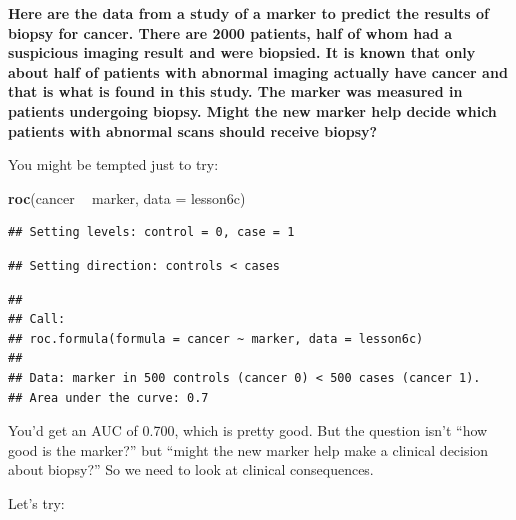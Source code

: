 \documentclass[]{book}
\newenvironment{Shaded}{\begin{snugshade}}{\end{snugshade}}
\newcommand{\CommentTok}[1]{\textcolor[rgb]{0.56,0.35,0.01}{\textit{#1}}}
\newcommand{\DataTypeTok}[1]{\textcolor[rgb]{0.13,0.29,0.53}{#1}}
\newcommand{\KeywordTok}[1]{\textcolor[rgb]{0.13,0.29,0.53}{\textbf{#1}}}
\newcommand{\NormalTok}[1]{#1}
\newcommand{\OperatorTok}[1]{\textcolor[rgb]{0.81,0.36,0.00}{\textbf{#1}}}
\newcommand{\StringTok}[1]{\textcolor[rgb]{0.31,0.60,0.02}{#1}}
\begin{document}
\textbf{Here are the data from a study of a marker to predict the results of biopsy for cancer. There are 2000 patients, half of whom had a suspicious imaging result and were biopsied. It is known that only about half of patients with abnormal imaging actually have cancer and that is what is found in this study. The marker was measured in patients undergoing biopsy. Might the new marker help decide which patients with abnormal scans should receive biopsy?}

You might be tempted just to try:

\begin{Shaded}
\begin{Highlighting}[]
\KeywordTok{roc}\NormalTok{(cancer }\OperatorTok{~}\StringTok{ }\NormalTok{marker, }\DataTypeTok{data =}\NormalTok{ lesson6c)}
\end{Highlighting}
\end{Shaded}

\begin{verbatim}
## Setting levels: control = 0, case = 1
\end{verbatim}

\begin{verbatim}
## Setting direction: controls < cases
\end{verbatim}

\begin{verbatim}
## 
## Call:
## roc.formula(formula = cancer ~ marker, data = lesson6c)
## 
## Data: marker in 500 controls (cancer 0) < 500 cases (cancer 1).
## Area under the curve: 0.7
\end{verbatim}

You'd get an AUC of 0.700, which is pretty good. But the question isn't ``how good is the marker?'' but ``might the new marker help make a clinical decision about biopsy?'' So we need to look at clinical consequences.

Let's try:

\begin{Shaded}
\end{Shaded}
\end{document}

